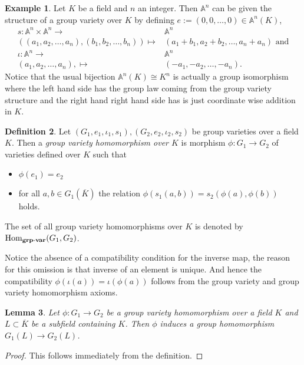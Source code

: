 \documentclass[a4paper,12pt,reqno]{amsart}
\newcommand{\field}[1]{\mathbb{#1}}  %
\newcommand{\A}{\field{A}}
\newcommand{\HomGrpVar}{\text{Hom}_{\bf grp\text{-}var}}
\newtheorem{lemma}{Lemma}
\theoremstyle{definition}
\newtheorem{definition}[lemma]{Definition}
\newtheorem{example}[lemma]{Example}
\numberwithin{lemma}{section}
\numberwithin{equation}{section}
\numberwithin{figure}{section}
\begin{document}
\begin{example}
Let $K$ be a field and $n$ an integer. Then $\A^n$ can be given the structure of a group variety over $K$ by defining $e:=(0,0,\ldots,0) \in \A^n(K)$, 
\begin{align}
s \colon  \A^n \times \A^n \to& \A^n \\
((a_1,a_2,\ldots, a_n),(b_1,b_2,\ldots, b_n)) \mapsto& (a_1+b_1,a_2+b_2,\ldots, a_n+a_n) \text{ and} \\
\iota \colon  \A^n  \to& \A^n \\
(a_1,a_2,\ldots, a_n), \mapsto& (-a_1,-a_2,\ldots, -a_n).
\end{align}
Notice that the usual bijection $\A^n(K) \cong K^n$ is actually a group isomorphism where the left hand side has the group law coming from the group variety structure and the right hand right hand side has is just coordinate wise addition in $K$.
\end{example}

\begin{definition}\label{def:group-variety-homomorphism}
Let $(G_1,e_1,\iota_1,s_1), (G_2,e_2,\iota_2,s_2)$ be group varieties over  a field $K$. Then a \textit{group variety homomorphism over $K$} is morphism $\phi: G_1 \to G_2$ of varieties defined over $K$ such that
\begin{itemize}
	\item $\phi(e_1)=e_2$
	\item for all $a,b \in G_1(\overline K)$ the relation $\phi(s_1(a,b)) = s_2(\phi(a),\phi(b))$ holds.
\end{itemize}
The set of all group variety homomorphisms over $K$ is denoted by $\HomGrpVar(G_1,G_2)$.
\end{definition}
Notice the absence of a compatibility condition for the inverse map, the reason for this omission is that inverse of an element is unique. And hence the compatibility $\phi(\iota(a))=\iota(\phi(a))$ follows from the group variety and group variety homomorphism axioms.

\begin{lemma}\label{lem:group-homomorphism-from-group-variety-homomorphism}
	Let $\phi: G_1 \to G_2$ be a group variety homomorphism over a field $K$ and $L\subset \overline K$ be a subfield containing $K$. Then $\phi$ induces a group homomorphism  $G_1(L) \to G_2(L)$.
\end{lemma}
\begin{proof}
	This follows immediately from the definition.
\end{proof}
\end{document}
